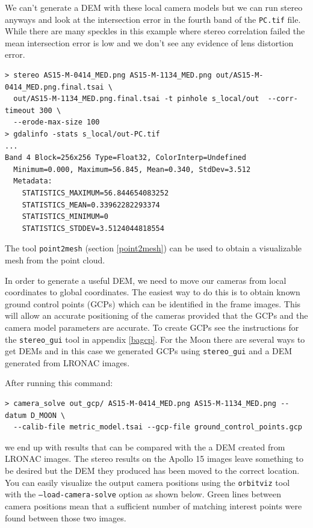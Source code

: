 We can't generate a DEM with these local camera models but we can run stereo anyways
and look at the intersection error in the fourth band of the \texttt{PC.tif} file.  While
there are many speckles in this example where stereo correlation failed the mean
intersection error is low and we don't see any evidence of lens distortion error.

\begin{verbatim}
> stereo AS15-M-0414_MED.png AS15-M-1134_MED.png out/AS15-M-0414_MED.png.final.tsai \
  out/AS15-M-1134_MED.png.final.tsai -t pinhole s_local/out  --corr-timeout 300 \
  --erode-max-size 100
> gdalinfo -stats s_local/out-PC.tif
...
Band 4 Block=256x256 Type=Float32, ColorInterp=Undefined
  Minimum=0.000, Maximum=56.845, Mean=0.340, StdDev=3.512
  Metadata:
    STATISTICS_MAXIMUM=56.844654083252
    STATISTICS_MEAN=0.33962282293374
    STATISTICS_MINIMUM=0
    STATISTICS_STDDEV=3.5124044818554
\end{verbatim}

The tool \texttt{point2mesh} (section \ref{point2mesh}) can be used to
obtain a visualizable mesh from the point cloud. 

In order to generate a useful DEM, we need to move our cameras from local coordinates
to global coordinates.  The easiest way to do this is to obtain known ground control
points (GCPs) which can be identified in the frame images.  This will allow an accurate
positioning of the cameras provided that the GCPs and the camera model parameters are
accurate.  To create GCPs see the instructions for the \texttt{stereo\_gui} tool in
appendix \ref{bagcp}.
For the Moon there are several ways to get DEMs and in this case we generated GCPs
using \texttt{stereo\_gui} and a DEM generated from LRONAC images.

After running this command:
\begin{verbatim}
> camera_solve out_gcp/ AS15-M-0414_MED.png AS15-M-1134_MED.png --datum D_MOON \
  --calib-file metric_model.tsai --gcp-file ground_control_points.gcp
\end{verbatim}
we end up with results that can be compared with the a DEM created from LRONAC images.
The stereo results on the Apollo 15 images leave something to be desired but the
DEM they produced has been moved to the correct location.  You can easily visualize
the output camera positions using the \texttt{orbitviz} tool with the
\texttt{--load-camera-solve} option as shown below.  Green lines between camera
positions mean that a sufficient number of matching interest points were found
between those two images.

